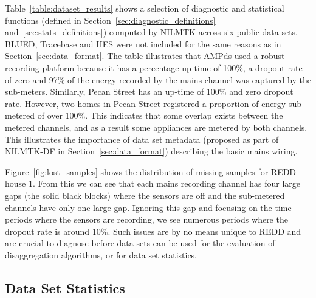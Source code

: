 \documentclass{sig-alternate}
\newcommand{\secref}[1]{Section~\ref{#1}}
\newcommand{\tabref}[1]{Table~\ref{#1}}
\begin{document}
\noindent
\tabref{table:dataset_results} shows a selection of diagnostic and statistical functions 
(defined in Section~\ref{sec:diagnostic_definitions} and~\ref{sec:stats_definitions}) computed by NILMTK
across six public data sets. BLUED, Tracebase and HES were not included for the same reasons as in \secref{sec:data_format}. The table illustrates
that AMPds used a robust recording platform because it has a
percentage up-time of 100\%, a dropout rate of zero and 97\% of the
energy recorded by the mains channel was captured by the sub-meters.
Similarly, Pecan Street has an up-time of 100\% and zero dropout rate.  However, two homes
in Pecan Street registered a proportion of energy sub-metered of over
100\%. This indicates that some overlap exists between the metered channels, and as a result some appliances are metered by both channels.
This illustrates the importance of data set metadata (proposed as part
of NILMTK-DF in Section~\ref{sec:data_format}) describing the basic
mains wiring.

Figure~\ref{fig:lost_samples} shows the distribution of missing
samples for REDD house 1.  From this we can see that each mains
recording channel has four large gaps (the solid black blocks) where
the sensors are off and the sub-metered channels have
only one large gap.  Ignoring this gap and focusing on the time
periods where the sensors are recording, we see numerous periods where
the dropout rate is around 10\%.  Such issues are by no means unique
to REDD and are crucial to diagnose before data sets can be used for
the evaluation of disaggregation algorithms, or for data set
statistics.

\subsection{Data Set Statistics}
\end{document}
